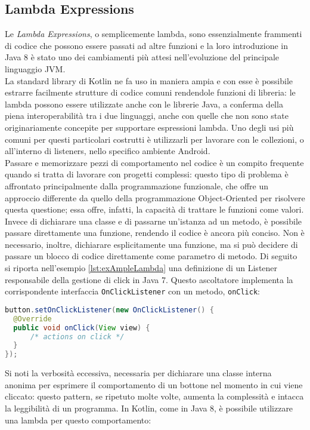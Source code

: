 \subsection{Lambda Expressions}
Le {\em Lambda Expressions}, o semplicemente lambda, sono essenzialmente frammenti di codice che possono essere passati ad altre funzioni e la loro introduzione in Java 8 è stato uno dei cambiamenti più attesi nell'evoluzione del principale linguaggio JVM.\\ La standard library di Kotlin ne fa uso in maniera ampia e con esse è possibile estrarre facilmente strutture di codice comuni rendendole funzioni di libreria: le lambda possono essere utilizzate anche con le librerie Java, a conferma della piena interoperabilità tra i due linguaggi, anche con quelle che non sono state originariamente concepite per supportare espressioni lambda. Uno degli usi più comuni per questi particolari costrutti è utilizzarli per lavorare con le collezioni, o all'interno di listeners, nello specifico ambiente Android.\\

Passare e memorizzare pezzi di comportamento nel codice è un compito frequente quando si tratta di lavorare con progetti complessi: questo tipo di problema è affrontato principalmente dalla programmazione funzionale, che offre un approccio differente da quello della programmazione Object-Oriented per risolvere questa questione; essa offre, infatti, la capacità di trattare le funzioni come valori. Invece di dichiarare una classe e di passarne un'istanza ad un metodo, è possibile passare direttamente una funzione, rendendo il codice è ancora più conciso. Non è necessario, inoltre, dichiarare esplicitamente una funzione, ma si può decidere di passare un blocco di codice direttamente come parametro di metodo. Di seguito si riporta nell'esempio \ref{lst:exAmpleLambda} una definizione di un Listener responsabile della gestione di click in Java 7. Questo ascoltatore implementa la corrispondente interfaccia \texttt{OnClickListener} con un metodo, \texttt{onClick}:\\

\begin{lstlisting}[caption={Definizione di \texttt{OnClickListener} in Java}, captionpos=b, label={lst:exAmpleLambda}, language=Java]
button.setOnClickListener(new OnClickListener() {
  @Override
  public void onClick(View view) {
      /* actions on click */
  }
});
\end{lstlisting}

Si noti la verbosità eccessiva, necessaria per dichiarare una classe interna anonima per esprimere il comportamento di un bottone nel momento in cui viene cliccato: questo pattern, se ripetuto molte volte, aumenta la complessità e intacca la leggibilità di un programma. In Kotlin, come in Java 8, è possibile utilizzare una lambda per questo comportamento:\\

